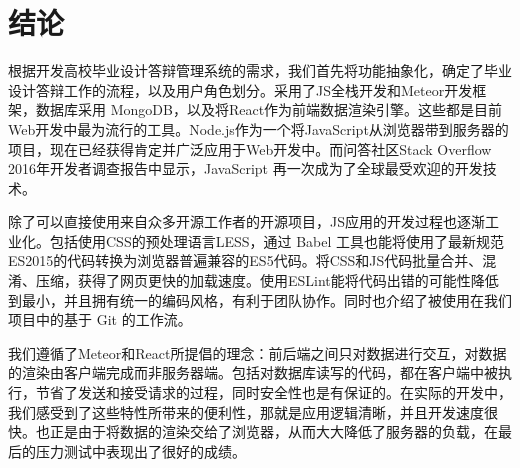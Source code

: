 \section*{结论}

根据开发高校毕业设计答辩管理系统的需求，我们首先将功能抽象化，确定了毕业设计答辩工作的流程，以及用户角色划分。采用了JS全栈开发和Meteor开发框架，数据库采用 MongoDB，以及将React作为前端数据渲染引擎。这些都是目前Web开发中最为流行的工具。Node.js作为一个将JavaScript从浏览器带到服务器的项目，现在已经获得肯定并广泛应用于Web开发中。而问答社区Stack Overflow 2016年开发者调查报告中显示，JavaScript 再一次成为了全球最受欢迎的开发技术。

除了可以直接使用来自众多开源工作者的开源项目，JS应用的开发过程也逐渐工业化。包括使用CSS的预处理语言LESS，通过 Babel 工具也能将使用了最新规范ES2015的代码转换为浏览器普遍兼容的ES5代码。将CSS和JS代码批量合并、混淆、压缩，获得了网页更快的加载速度。使用ESLint能将代码出错的可能性降低到最小，并且拥有统一的编码风格，有利于团队协作。同时也介绍了被使用在我们项目中的基于 Git 的工作流。

我们遵循了Meteor和React所提倡的理念：前后端之间只对数据进行交互，对数据的渲染由客户端完成而非服务器端。包括对数据库读写的代码，都在客户端中被执行，节省了发送和接受请求的过程，同时安全性也是有保证的。在实际的开发中，我们感受到了这些特性所带来的便利性，那就是应用逻辑清晰，并且开发速度很快。也正是由于将数据的渲染交给了浏览器，从而大大降低了服务器的负载，在最后的压力测试中表现出了很好的成绩。
